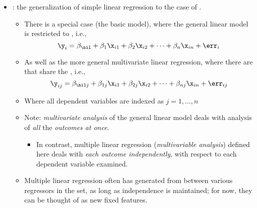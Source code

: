 \begin{itemize}
\begin{itemize}
    \item {}: the generalization of simple linear regression to the case of .
      \begin{itemize}
        \item There is a special case (the basic model), where the general linear model is restricted to , i.e.,
        \[%
        \y_i = \beta_\nil + \beta_1 \x_{i1} + \beta_2 \x_{i2} + \cdots + \beta_n \x_{in} + \err_{i}
        \]%
        \item As well as the more general multivariate linear regression, where there are  that share the , i.e.,
        \[%
        \y_{ij} = \beta_{\nil j} + \beta_{1j} \x_{i1} + \beta_{2j} \x_{i2} + \cdots + \beta_{nj} \x_{in} + \err_{ij}
        \]%
        \item Where all dependent variables are indexed as \(j = 1, \ldots, n\)
        \item Note: \emph{multivariate analysis} of the general linear model deals with analysis of \emph{all} the \emph{outcomes at once}.
          \begin{itemize}
            \item In contrast, multiple linear regression (\emph{multivariable analysis}) defined here deals with \emph{each outcome independently}, with respect to each dependent variable examined.
          \end{itemize}
        \item Multiple linear regression often has  generated from  between various regressors in the set, as long as independence is maintained; for now, they can be thought of as new fixed features.
      \end{itemize}
  \end{itemize}
  
  

\end{itemize}
